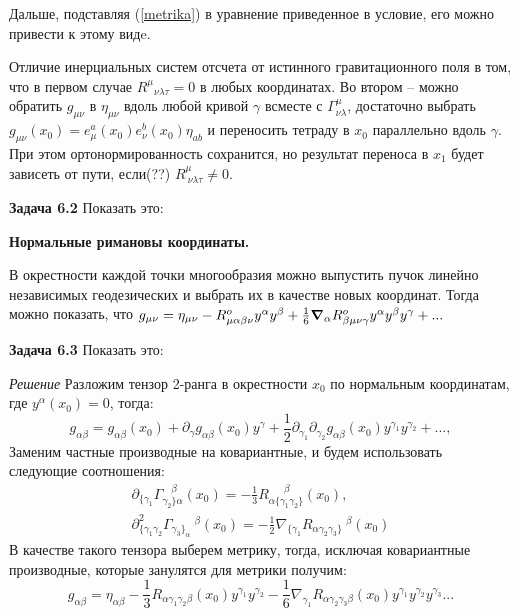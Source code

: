 \documentclass[a4paper]{article}
\begin{document}
Дальше, подставляя  (\ref{metrika}) в уравнение приведенное в условие, его можно привести к этому видe.
\par
Отличие инерциальных систем отсчета от истинного гравитационного поля в том, что в первом случае $R^\mu{}_{\nu \lambda \tau} = 0$ в любых координатах. Во втором -- можно обратить $g_{\mu \nu}$ в $ \eta_{\mu \nu}$ вдоль любой кривой $\gamma$ всместе с $\Gamma^\mu_{\nu \lambda}$, достаточно выбрать $g_{\mu \nu}(x_0) = e^a_\mu (x_0) e^b_\nu (x_0)\eta_{a b} $ и переносить  тетраду в $x_0$ параллельно вдоль $\gamma$. При этом ортонормированность сохранится, но результат переноса в $x_1$ будет зависеть от пути, если(??) $R^{\mu}_{ {~} \nu \lambda \tau} \neq 0$.
\par
\textbf{Задача 6.2}  Показать это:
\par
\textbf{Нормальные римановы координаты.} 
\par 
В окрестности каждой точки многообразия можно выпустить пучок линейно независимых геодезических и выбрать их в качестве новых координат. Тогда можно показать, что $g_{\mu \nu} = \eta_{\mu \nu} - R^o_{\mu \alpha \beta \nu} y^\alpha y^\beta + \frac{1}{6} \grad_\alpha R^o_{\beta \mu \nu \gamma} y^\alpha y^\beta y^\gamma + ...$
\par
\textbf{Задача 6.3}  Показать это:
\par 
\textit{Решение} Разложим тензор 2-ранга в окрестности $x_0$ по нормальным координатам, где $y^\alpha(x_0) = 0$, тогда:
\begin{equation}
g_{\alpha \beta} = g_{\alpha \beta}(x_0) + \partial_{\gamma} g_{\alpha \beta}(x_0) y^{\gamma} + \frac{1}{2} \partial_{\gamma_1} \partial_{\gamma_2} g_{\alpha \beta}(x_0) y^{\gamma_1} y^{\gamma_2} + ...,
\end{equation}
Заменим частные производные на ковариантные, и будем использовать следующие соотношения: 
\begin{align}
\partial_{\lbrace\gamma_1} \Gamma_{\gamma_2\rbrace \alpha}^{{~}{~}{~} {~}\beta}(x_0)  = - \frac{1}{3} R_{\alpha\lbrace \gamma_1 \gamma_2 \rbrace}^{{~}{~}{~}{~}{~}{~}{~}\beta}(x_0), \\
\partial^2_{\lbrace \gamma_1 \gamma_2} \Gamma_{\gamma_3 \rbrace_\alpha}{~}^\beta (x_0) = -\frac{1}{2} \nabla_{\lbrace \gamma_1} R_{\alpha \gamma_2 \gamma_3\rbrace}{~}^\beta (x_0) 
 \end{align}
 В качестве такого тензора выберем метрику, тогда, исключая ковариантные производные, которые занулятся для метрики получим:
 \begin{equation}
 g_{\alpha \beta} = \eta_{\alpha \beta} - \frac{1}{3} R_{\alpha \gamma_1 \gamma_2 \beta}(x_0) y^{\gamma_1} y^{\gamma_2} - \frac{1}{6}\nabla_{\gamma_1} R_{\alpha \gamma_2 \gamma_3 \beta}(x_0) y^{\gamma_1} y^{\gamma_2} y^{\gamma_3}...
 \end{equation}
\end{document}
